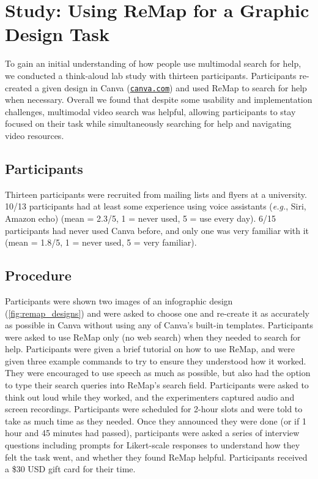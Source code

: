 \section{Study: Using ReMap for a Graphic Design Task}
\label{sec:remap_study}
To gain an initial understanding of how people use multimodal search for help, we conducted a think-aloud lab study with thirteen participants. Participants re-created a given design in Canva (\href{https://canva.com}{\nolinkurl{canva.com}}) and used ReMap to search for help when necessary. Overall we found that despite some usability and implementation challenges, multimodal video search was helpful, allowing participants to stay focused on their task while simultaneously searching for help and navigating video resources. 

\subsection{Participants}
Thirteen participants were recruited from mailing lists and flyers at a university. 10/13 participants had at least some experience using voice assistants (\textit{e.g.}, Siri, Amazon echo) (mean = 2.3/5, 1 = never used, 5 = use every day). 6/15 participants had never used Canva before, and only one was very familiar with it (mean = 1.8/5, 1 = never used, 5 = very familiar).

\subsection{Procedure}
Participants were shown two images of an infographic design (\autoref{fig:remap_designs}) and were asked to choose one and re-create it as accurately as possible in Canva without using any of Canva's built-in templates. Participants were asked to use ReMap only (no web search) when they needed to search for help. Participants were given a brief tutorial on how to use ReMap, and were given three example commands to try to ensure they understood how it worked. They were encouraged to use speech as much as possible, but also had the option to type their search queries into ReMap's search field. Participants were asked to think out loud while they worked, and the experimenters captured audio and screen recordings. Participants were scheduled for 2-hour slots and were told to take as much time as they needed. Once they announced they were done (or if 1 hour and 45 minutes had passed), participants were asked a series of interview questions including prompts for Likert-scale responses to understand how they felt the task went, and whether they found ReMap helpful. Participants received a \$30 USD gift card for their time.

